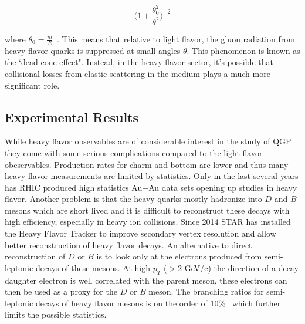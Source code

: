 \begin{equation}\label{eq:deadcone}
\Big( 1 + \frac{\theta^2_0}{\theta^2} \Big)^{-2}
\end{equation}

where $ \theta_0 = \frac{m}{E}$~\cite{glurad}. This means that relative to light flavor, the gluon radiation from heavy flavor quarks is suppressed at small angles $\theta$. This phenomenon is known as the `dead cone effect". Instead, in the heavy flavor sector, it's possible that collisional losses from elastic scattering in the medium plays a much more significant role.

\subsection{Experimental Results}

While heavy flavor observables are of considerable interest in the study of QGP they come with some serious complications compared to the light flavor obeservables. Production rates for charm and bottom are lower and thus many heavy flavor measurements are limited by statistics. Only in the last several years has RHIC produced high statistics Au+Au data sets opening up studies in heavy flavor. Another problem is that the heavy quarks mostly hadronize into $D$ and $B$ mesons which are short lived and it is difficult to reconstruct these decays with high efficiency, especially in heavy ion collisions. Since 2014 STAR has installed the Heavy Flavor Tracker to improve secondary vertex resolution and allow better reconstruction of heavy flavor decays. An alternative to direct reconstruction of $D$ or $B$ is to look only at the electrons produced from semi-leptonic decays of these mesons. At high $p_T$ ($> 2$ GeV/c) the direction of a decay daughter electron is well correlated with the parent meson, these electrons can then be used as a proxy for the $D$ or $B$ meson. The branching ratios for semi-leptonic decays of heavy flavor mesons is on the order of 10\%~\cite{pdg} which further limits the possible statistics.

